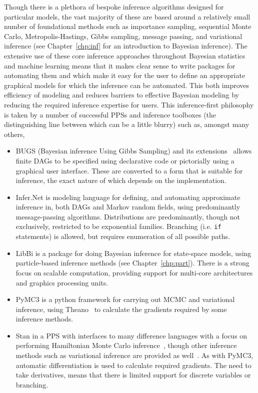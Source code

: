 Though there is a plethora of bespoke inference algorithms designed for particular models, the vast majority of these are based around
a relatively small number of foundational methods such as importance sampling, sequential Monte Carlo,
Metropolis-Hastings, Gibbs sampling, message passing, and variational inference (see Chapter~\ref{chp:inf}
for an introduction to Bayesian inference).
The extensive use of these core inference approaches throughout Bayesian statistics and machine
learning means that it makes clear sense to write packages for automating them and which
make it easy for the user to define an appropriate graphical models for which the inference can be automated.
This both improves efficiency of modeling and reduces barriers to effective Bayesian modeling by reducing the
required inference expertise for users.  This inference-first philosophy is taken by a number of successful PPSs
and inference toolboxes (the distinguishing line between which can be a little blurry) such as, amongst many others,
\begin{itemize}
	\item BUGS (Bayesian inference Using Gibbs Sampling) \citep{spiegelhalter1996bugs} and its 
	extensions~\citep{lunn2000winbugs,plummer2003jags,todeschini2014biips}
	allows finite DAGs to be specified using declarative code or pictorially using a graphical user
	interface.  These are converted to a form that is suitable for inference, the exact nature of which
	depends on the implementation.
	\item Infer.Net \citep{minka_software_2010} is modeling language for defining, and automating approximate inference in,
	both DAGs and Markov random fields, using predominantly message-passing algorithms. Distributions
	are predominantly, though not exclusively, restricted to be exponential families.  Branching (i.e. \texttt{if} statements) 
	is allowed, but requires enumeration of all possible paths.
	\item LibBi \citep{murray2013bayesian} is a package for doing Bayesian inference for state-space models,
	using particle-based inference methods (see Chapter~\ref{chp:part}).  There is a strong focus on scalable
	computation, providing support for multi-core architectures and graphics processing units.
	\item PyMC3 \citep{salvatier2016probabilistic} is a python framework for carrying out MCMC and variational
	inference, using Theano~\citep{bergstra2010theano} to calculate the gradients required by some inference methods.
	\item Stan \citep{carpenter2015stan} in a PPS with interfaces to many difference languages with a
	focus on performing Hamiltonian Monte Carlo inference~\citep{duane1987hybrid,hoffman2014no}, though
	other inference methods such as variational inference are provided as well~\citep{kucukelbir2015automatic}.
	As with PyMC3, automatic differentiation is used to calculate required gradients.  The need to take
	derivatives, means that there is limited support for discrete variables or branching.
\end{itemize}
